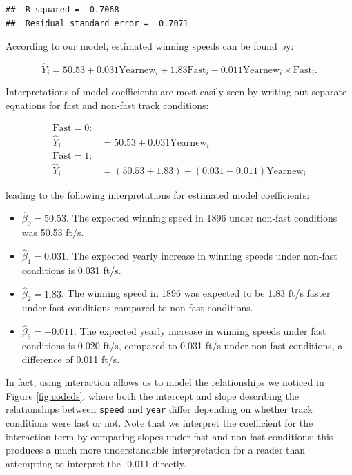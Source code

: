 \documentclass[
]{krantz}
\providecommand{\tightlist}{%
  \setlength{\itemsep}{0pt}\setlength{\parskip}{0pt}}
\begin{document}
\begin{verbatim}
##  R squared =  0.7068 
##  Residual standard error =  0.7071
\end{verbatim}

According to our model, estimated winning speeds can be found by:

\begin{equation}
 \hat{Y}_{i}=50.53+0.031\textrm{Yearnew}_{i}+1.83\textrm{Fast}_{i}-0.011\textrm{Yearnew}_{i}\times\textrm{Fast}_{i}.
\label{eq:model5est}
\end{equation}

Interpretations of model coefficients are most easily seen by writing out separate equations for fast and non-fast track conditions:

\begin{align*}
 \textrm{Fast}=0: & \\
 \hat{Y}_{i} &= 50.53+0.031\textrm{Yearnew}_{i} \\
 \textrm{Fast}=1: & \\
 \hat{Y}_{i} &= (50.53+1.83)+(0.031-0.011)\textrm{Yearnew}_{i}
 \end{align*}

leading to the following interpretations for estimated model coefficients:

\begin{itemize}
\tightlist
\item
  \(\hat{\beta}_{0} = 50.53\). The expected winning speed in 1896 under non-fast conditions was 50.53 ft/s.
\item
  \(\hat{\beta}_{1} = 0.031\). The expected yearly increase in winning speeds under non-fast conditions is 0.031 ft/s.
\item
  \(\hat{\beta}_{2} = 1.83\). The winning speed in 1896 was expected to be 1.83 ft/s faster under fast conditions compared to non-fast conditions.
\item
  \(\hat{\beta}_{3} = -0.011\). The expected yearly increase in winning speeds under fast conditions is 0.020 ft/s, compared to 0.031 ft/s under non-fast conditions, a difference of 0.011 ft/s.
\end{itemize}

In fact, using interaction allows us to model the relationships we noticed in Figure \ref{fig:codeds}, where both the intercept and slope describing the relationships between \texttt{speed} and \texttt{year} differ depending on whether track conditions were fast or not. Note that we interpret the coefficient for the interaction term by comparing slopes under fast and non-fast conditions; this produces a much more understandable interpretation for a reader than attempting to interpret the -0.011 directly.
\end{document}
